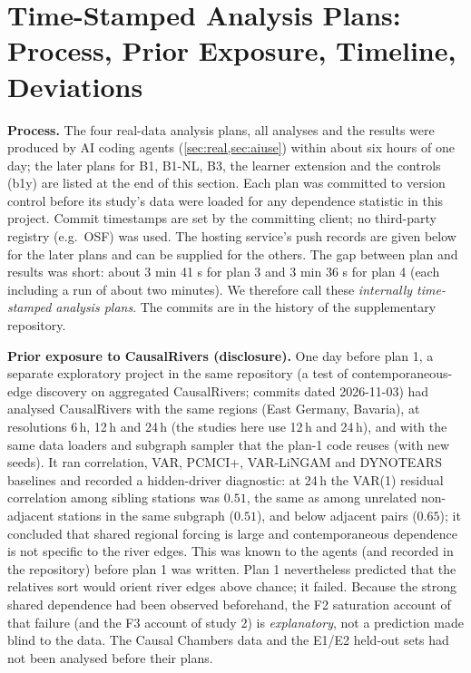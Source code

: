 \section{Time-Stamped Analysis Plans: Process, Prior Exposure, Timeline, Deviations}
\label{app:prereg}

\textbf{Process.} The four real-data analysis plans, all analyses and the
results were produced by AI coding agents (\cref{sec:real,sec:aiuse})
within about six hours of one day; the later plans for B1, B1-NL, B3, the learner
extension and the controls (b1y) are listed at the end of this section. Each plan was committed to version control before its
study's data were loaded for any dependence statistic in this project. Commit
timestamps are set by the committing client; no third-party registry (e.g.\
OSF) was used. The hosting service's push records are given below for the
later plans and can be supplied for the others. The gap between plan and results
was short: about 3 min 41 s for plan 3 and 3 min 36 s for plan 4 (each
including a run of about two minutes). We therefore call these
\emph{internally time-stamped analysis plans}. The commits are in the history of the
supplementary repository.

\textbf{Prior exposure to CausalRivers (disclosure).} One day before plan 1, a
separate exploratory project in the same repository (a test of
contemporaneous-edge discovery on aggregated CausalRivers; commits dated
2026-11-03) had analysed CausalRivers with the same regions (East Germany,
Bavaria), at resolutions 6\,h, 12\,h and 24\,h (the studies here use 12\,h and
24\,h), and with the same data loaders and subgraph sampler that the plan-1 code
reuses (with new seeds). It ran correlation, VAR, PCMCI+, VAR-LiNGAM and
DYNOTEARS baselines and recorded a hidden-driver diagnostic: at 24\,h the VAR(1)
residual correlation among sibling stations was $0.51$, the same as among
unrelated non-adjacent stations in the same subgraph ($0.51$), and below
adjacent pairs ($0.65$); it concluded that shared regional forcing is large and
contemporaneous dependence is not specific to the river edges. This was known
to the agents (and recorded in the repository) before plan 1 was written. Plan
1 nevertheless predicted that the relatives sort would orient river edges
above chance; it failed. Because the strong shared dependence had been
observed beforehand, the F2 saturation account of that failure (and the F3
account of study 2) is \emph{explanatory}, not a prediction made blind to the
data. The Causal Chambers data and the E1/E2 held-out sets had not been
analysed before their plans.


